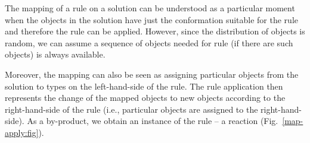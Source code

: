 \documentclass[12pt]{fithesis2}
\begin{document}
The mapping of a rule on a solution can be understood as a particular moment when the objects in the solution have just the conformation suitable for the rule and therefore the rule can be applied. However, since the distribution of objects is random, we can assume a sequence of objects needed for rule (if there are such objects) is always available.

Moreover, the mapping can also be seen as assigning particular objects from the solution to types on the left-hand-side of the rule. The rule application then represents the change of the mapped objects to new objects according to the right-hand-side of the rule (i.e., particular objects are assigned to the right-hand-side). As a by-product, we obtain an instance of the rule -- a reaction (Fig.~\ref{map-apply:fig}). %
\end{document}
